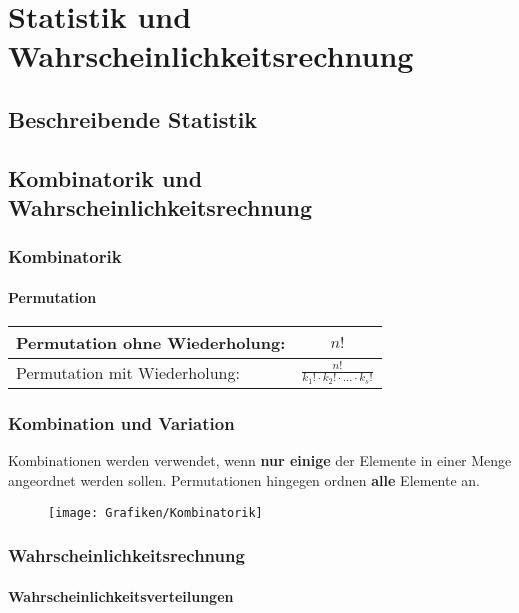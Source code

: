 \documentclass[12pt, a4paper, twoside]{scrreprt}
\begin{document}
\part{Statistik und Wahrscheinlichkeitsrechnung}

\chapter{Beschreibende Statistik}

\chapter{Kombinatorik und Wahrscheinlichkeitsrechnung}

\section{Kombinatorik}

\subsection{Permutation}

\begin{tabular}{lc}
  \toprule
  Permutation ohne Wiederholung: & \(n!\)\\
  \midrule
  Permutation mit Wiederholung: & \(\displaystyle{\frac{n!}{k_1! \cdot k_2! \cdot \ldots \cdot k_s!}}\)\\
  \bottomrule
\end{tabular}

\section{Kombination und Variation}

Kombinationen werden verwendet, wenn \textbf{nur einige} der Elemente in einer Menge angeordnet werden sollen. Permutationen hingegen ordnen \textbf{alle} Elemente an.

\begin{figure}[H]
  \centering
  \texttt{[image: Grafiken/Kombinatorik]}
\end{figure}

\section{Wahrscheinlichkeitsrechnung}

\subsection{Wahrscheinlichkeitsverteilungen}
\end{document}
